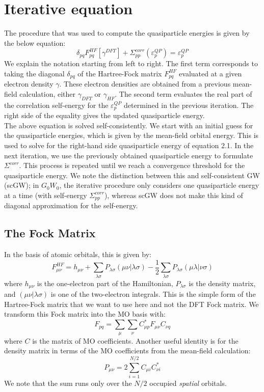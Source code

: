 \documentclass[12pt]{caltech_thesis}
\begin{document}
\section{Iterative equation}
The procedure that was used to compute the quasiparticle energies is given by the below equation:
\begin{equation}
    \delta_{pq}F_{pq}^{HF}[\gamma^{DFT}] + \Sigma_{pp}^{corr}(\varepsilon_{p}^{QP}) = \varepsilon_{p}^{QP}
\end{equation}
We explain the notation starting from left to right. The first term corresponds to taking the diagonal $\delta_{pq}$ of the Hartree-Fock matrix $F_{pq}^{HF}$ evaluated at a given electron density $\gamma$. These electron densities are obtained from a previous mean-field calculation, either $\gamma_{DFT}$ or $\gamma_{HF}$. The second term evaluates the real part of the correlation self-energy for the $\varepsilon_{p}^{QP}$ determined in the previous iteration. The right side of the equality gives the updated quasiparticle energy.\\ The above equation is solved self-consistently. We start with an initial guess for the quasiparticle energies, which is given by the mean-field orbital energy. This is used to solve for the right-hand side quasiparticle energy of equation 2.1. In the next iteration, we use the previously obtained quasiparticle energy to formulate $\Sigma^{corr}$. This process is repeated until we reach a convergence threshold for the quasiparticle energy. We note the distinction between this and self-consistent GW (scGW); in $G_0W_0$, the iterative procedure only considers one quasiparticle energy at a time (with self-energy $\Sigma^{corr}_{pp}$), whereas scGW does not make this kind of diagonal approximation for the self-energy.
\subsection{The Fock Matrix}
In the basis of atomic orbitals, this is given by:
\begin{equation}
F_{\mu\nu}^{HF} = h_{\mu\nu} + \sum_{\lambda\sigma}P_{\lambda\sigma}(\mu\nu|\lambda\sigma) - \frac{1}{2}\sum_{\lambda\sigma}P_{\lambda\sigma}(\mu\lambda|\nu\sigma)
\end{equation}
where $h_{\mu\nu}$ is the one-electron part of the Hamiltonian, $P_{\lambda\sigma}$ is the density matrix, and $(\mu\nu|\lambda\sigma)$ is one of the two-electron integrals. \autocite{szabo_modern_2012} This is the simple form of the Hartree-Fock matrix that we want to use here and not the DFT Fock matrix. We transform this Fock matrix into the MO basis with:
\begin{equation}
   F_{pq} = \sum_{\mu} \sum_{\nu} C_{\mu p}^{*}F_{\mu\nu}C_{\nu q}
\end{equation}
where $C$ is the matrix of MO coefficients. Another useful identity is for the density matrix in terms of the MO coefficients from the mean-field calculation: 
\begin{equation}
P_{\mu\nu} = 2\sum_{i=1}^{N/2}C_{\mu i}C_{\nu i}^{*}
\end{equation}
We note that the sum runs only over the $N/2$ occupied \emph{spatial} orbitals.
\end{document}
